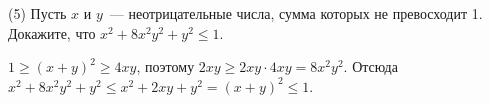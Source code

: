 \textsf{(5)}
Пусть $x$ и $y$~--- неотрицательные числа, сумма которых не превосходит 1.
Докажите, что $x^2 + 8 x^2 y^2 + y^2 \leq 1$.

\solution
$1 \geq (x + y)^2 \geq 4 x y$, поэтому
$2 x y \geq 2 x y \cdot 4 x y = 8 x^2 y^2$.
Отсюда
$x^2 + 8 x^2 y^2 + y^2 \leq x^2 + 2 x y + y^2 = (x + y)^2 \leq 1$.

